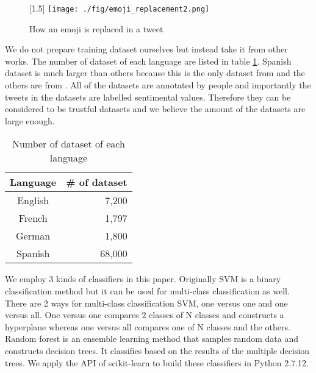 \documentclass[twocolumn]{article}
\begin{document}
\begin{figure}
	\centering
	\scalebox{1.5}[1.5]{
	\texttt{[image: ./fig/emoji\_replacement2.png]}
	}
	\caption{How an emoji is replaced in a tweet}
	\label{fig:emoji_replacement}
\end{figure}

We do not prepare training dataset ourselves but instead take it from other works.
The number of dataset of each language are listed in table \ref{tab:dataset}.
Spanish dataset is much larger than others because this is the only dataset from \cite{dataset_spanish} and the others are from \cite{dataset}.
All of the datasets are annotated by people and importantly the tweets in the datasets are labelled sentimental values.
Therefore they can be considered to be trustful datasets and we believe the amount of the datasets are large enough.

\begin{table}[ht]
	\caption{Number of dataset of each language}
	\centering
	\begin{tabular}{|c|r|} \hline
	Language & \# of dataset \\ \hline \hline
	English & 7,200  \\ \hline
	French & 1,797  \\ \hline
	German & 1,800  \\ \hline
	Spanish & 68,000  \\ \hline
	\end{tabular}
	\label{tab:dataset}
\end{table}

We employ 3 kinds of classifiers in this paper.
Originally SVM is a binary classification method but it can be used for multi-class classification as well.
There are 2 ways for multi-class classification SVM, one versus one and one versus all.
One versus one compares 2 classes of N classes and constructs a hyperplane whereas one versus all compares one of N classes and the others.
Random forest is an ensemble learning method that samples random data and constructs decision trees.
It classifies based on the results of the multiple decision trees. 
We apply the API of scikit-learn \cite{scikit} to build these classifiers in Python 2.7.12.
\end{document}
